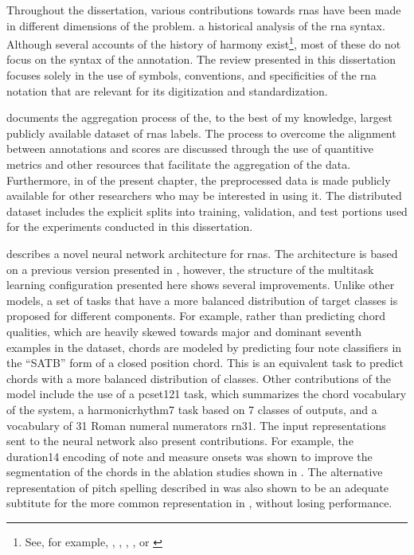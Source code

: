 
Throughout the dissertation, various contributions towards
\glspl{rna} have been made in different dimensions of the
problem.  a
historical analysis of the \gls{rna} syntax. Although
several accounts of the history of harmony
exist\footnote{See, for example,
\textcite{christensen2002tonality},
\textcite{grave1988praise}, \textcite{laitz2010graduate},
\textcite{sansallovich2013quintas}, or
\textcite{wason1985viennese}}, most of these do not focus on
the syntax of the annotation. The review presented in this
dissertation focuses solely in the use of symbols,
conventions, and specificities of the \gls{rna} notation
that are relevant for its digitization and standardization.

 documents the
aggregation process of the, to the best of my knowledge,
largest publicly available dataset of \glspl{rna} labels.
The process to overcome the alignment between annotations
and scores are discussed through the use of quantitive
metrics and other resources that facilitate the aggregation
of the data. Furthermore, in  of
the present chapter, the preprocessed data is made publicly
available for other researchers who may be interested in
using it. The distributed dataset includes the explicit
splits into training, validation, and test portions used for
the experiments conducted in this dissertation.

 describes a novel neural network
architecture for \glspl{rna}. The architecture is based on a
previous version presented in
\textcite{napoleslopez2021augmentednet}, however, the
structure of the multitask learning configuration presented
here shows several improvements. Unlike other models, a set
of tasks that have a more balanced distribution of target
classes is proposed for different components. For example,
rather than predicting chord qualities, which are heavily
skewed towards major and dominant seventh examples in the
dataset, chords are modeled by predicting four note
classifiers in the ``SATB'' form of a closed position chord.
This is an equivalent task to predict chords with a more
balanced distribution of classes. Other contributions of the
model include the use of a \gls{pcset121} task, which
summarizes the chord vocabulary of the system, a
\gls{harmonicrhythm7} task based on 7 classes of outputs,
and a vocabulary of 31 Roman numeral numerators \gls{rn31}.
The input representations sent to the neural network also
present contributions. For example, the \gls{duration14}
encoding of note and measure onsets was shown to improve the
segmentation of the chords in the ablation studies shown in
. The alternative
representation of pitch spelling described in
 was also shown to be an
adequate subtitute for the more common representation in
, without losing performance.
